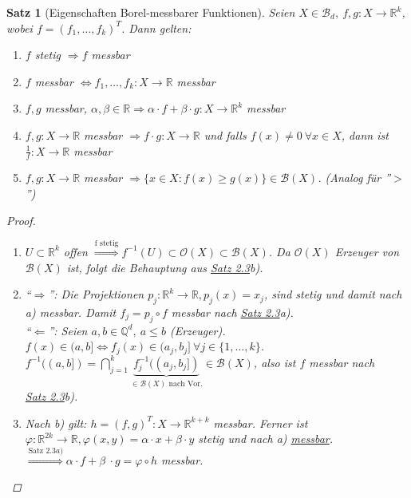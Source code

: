 \documentclass[a4paper]{scrreprt}
\newcommand{\R}{\mathbb{R}}
\newcommand{\Q}{\mathbb{Q}}
\newcommand{\Borel}{\mathcal{B}}
\newcommand{\Bd}{\Borel_d}
\newcommand{\jlabel}[1]{\label{j_#1}}
\newcommand{\jshortlink}[1]{\jhyperref{#1}{\text{#1}}}
\newcommand{\jhyperref}[2]{\hyperref[j_#1]{#2}}
\newcommand{\jlink}[1]{\jhyperref{#1}{#1}}
\newcommand{\jabb}[3]{ #1: #2 \rightarrow #3 }
\theoremstyle{plain}
\newtheorem{satz}[thm]{Satz}
\theoremstyle{definition}
\begin{document}
{{{\begin{satz}[Eigenschaften Borel-messbarer Funktionen]
\jlabel{Satz 2.5}
    Seien $X\in \Bd, \ \jabb{f,g}{X}{\R^k}$, wobei $f = (f_1, \dots, f_k)^T$. Dann gelten:
    \begin{enumerate}
        \item $f$ stetig $\Rightarrow f$ messbar
        \item $f$ messbar $\Leftrightarrow \jabb{f_1,\dots, f_k}{X}{\R}$ messbar
        \item $f,g$ messbar, $\alpha, \beta \in \R \Rightarrow \jabb{\alpha \cdot f + \beta \cdot g}{X}{\R^k}$ messbar
        \item $\jabb{f,g}{X}{\R}$ messbar $\Rightarrow \jabb{f\cdot g}{X}{\R}$ und falls $f(x)\ne 0 \ \forall x\in X$, dann ist $\jabb{\frac{1}{f}}{X}{\R}$ messbar
        \item $\jabb{f,g}{X}{\R}$ messbar $\Rightarrow \{x\in X: f(x) \ge g(x)\} \in \Borel(X)$. (Analog für ''$>$'')
    \end{enumerate}
    \begin{proof}
        \begin{enumerate}
            \item 
                $U \subset \R^k$ offen $\overset{\text{f stetig}}{\Rightarrow} f^{-1}(U) \subset \mathcal{O}(X) \subset \Borel(X)$. Da $\mathcal{O}(X)$ Erzeuger von $\Borel(X)$ ist, folgt die Behauptung aus \jlink{Satz 2.3}b).
            
            \item 
                ``$\Rightarrow$'': Die Projektionen $\jabb{p_j}{\R^k}{\R}, p_j(x) = x_j$, sind stetig und damit nach a) messbar. Damit $f_j = p_j \circ f$ messbar nach \jlink{Satz 2.3}a).\\
                ``$\Leftarrow$'': Seien $a,b\in \Q^d,\ a\le b$ (Erzeuger).\\
                $f(x) \in (a,b] \Leftrightarrow f_j(x)\in(a_j,b_j] \ \forall j\in \{1,\dots,k\}$.\\
                $f^{-1}((a,b]) = \bigcap_{j=1}^k \underbrace{f_j^{-1}((a_j,b_j])}_{\in \Borel(X) \text{ nach Vor.}} \in \Borel(X)$, also ist $f$ messbar nach \\
                \jlink{Satz 2.3}b).
            
            \item 
                Nach b) gilt: $\jabb{h=(f, g)^T}{X}{\R^{k+k}}$ messbar. Ferner ist $\jabb{\varphi}{\R^{2k}}{\R}, \varphi(x,y) = \alpha\cdot x + \beta\cdot y$ stetig und nach a) \jlink{messbar}.\\
                $\overset{\jshortlink{Satz 2.3}a)}{\Rightarrow} \alpha\cdot f + \beta\ \cdot g = \varphi \circ h$ messbar.
            

\end{enumerate}
\end{proof}
\end{satz}}}}
\end{document}
